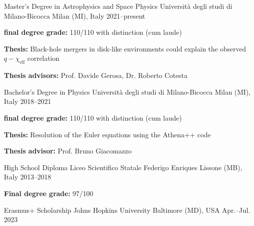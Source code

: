 


\begin{cventries}

\cventry
{Master's Degree in Astrophysics and Space Physics} %
{Università degli studi di Milano-Bicocca} %
{Milan (MI), Italy} %
{2021--present} %
{ %
\begin{cvitems}
	\item {\textbf{final degree grade:} 110/110 with distinction (cum laude)}
	\item {\textbf{Thesis:} Black-hole mergers in disk-like environments could explain  the observed $q-\chi_\mathrm{eff}$ correlation}
	\item {\textbf{Thesis advisors:} Prof. Davide Gerosa, Dr. Roberto Cotesta}
\end{cvitems}
}

\cventry
{Bachelor's Degree in Physics} %
{Università degli studi di Milano-Bicocca} %
{Milan (MI), Italy} %
{2018--2021} %
{ %
\begin{cvitems}
	\item {\textbf{final degree grade:} 110/110 with distinction (cum laude)}
	\item {\textbf{Thesis:} Resolution of the Euler equations using the Athena++ code}
	\item {\textbf{Thesis advisor:} Prof. Bruno Giacomazzo}
\end{cvitems}
}

\cventry
{High School Diploma} %
{Liceo Scientifico Statale Federigo Enriques} %
{Lissone (MB), Italy} %
{2013--2018} %
{ %
\begin{cvitems}
	\item {\textbf{Final degree grade:} 97/100}
\end{cvitems}
}
\end{cventries}


\begin{cventries}

\cventry
{Erasmus+ Scholarship} %
{Johns Hopkins University} %
{Baltimore (MD), USA} %
{Apr.--Jul. 2023} %
{}

\end{cventries}